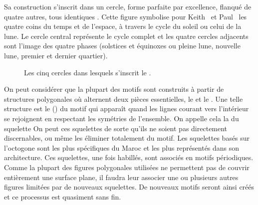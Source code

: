 Sa construction s'inscrit dans un cercle, forme parfaite par 
excellence, flanqué de quatre autres, tous identiques 
. Cette figure symbolise pour Keith~ 
et Paul~ les quatre coins du temps et de l'espace, à 
travers le cycle du soleil ou celui de la lune. Le cercle central 
représente le cycle complet et les quatre cercles adjacents sont 
l'image des quatre phases (solstices et équinoxes ou pleine lune, 
nouvelle lune, premier et dernier quartier).

\begin{figure}[htb]
  \caption{Les cinq cercles dans lesquels s'inscrit le \hatim 
           \autocite{Castera_1996}.{}}
  \label{fig:cercle}
\end{figure}

On peut considérer que la plupart des motifs sont construits à 
partir de structures polygonales où alternent deux pièces 
essentielles, le \hatim et le \saft. Une telle structure 
est le  () du motif qui 
apparaît quand les lignes courant vers l'intérieur se rejoignent 
en respectant les symétries de l'ensemble. On appelle cela la 
 du squelette On peut  ces 
squelettes de sorte qu'ils ne soient pas directement discernables, 
ou même les éliminer totalement du motif. Les squelettes basés sur 
l'octogone sont les plus spécifiques du Maroc et les plus représentés 
dans son architecture. Ces squelettes, une fois habillés, sont 
associés en motifs périodiques. Comme la plupart des figures 
polygonales utilisées ne permettent pas de couvrir entièrement une 
surface plane, il faudra leur associer une ou plusieurs autres figures 
limitées par de nouveaux squelettes. De nouveaux motifs seront ainsi 
créés et ce processus est quasiment sans fin.

